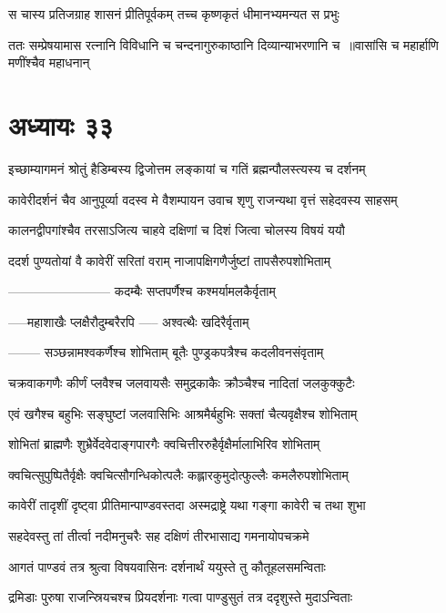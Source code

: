 \twolineshloka
{स चास्य प्रतिजग्राह शासनं प्रीतिपूर्वकम्}
{तच्च कृष्णकृतं धीमानभ्यमन्यत स प्रभुः}


\twolineshloka
{ततः सम्प्रेषयामास रत्नानि विविधानि च}
{चन्दनागुरुकाष्ठानि दिव्यान्याभरणानि च ॥वासांसि च महार्हाणि मणींश्चैव महाधनान्}


\chapter{अध्यायः ३३}
\twolineshloka
{इच्छाम्यागमनं श्रोतुं हैडिम्बस्य द्विजोत्तम}
{लङ्कायां च गतिं ब्रह्मन्पौलस्त्यस्य च दर्शनम्}


\threelineshloka
{कावेरीदर्शनं चैव आनुपूर्व्या वदस्व मे}
{वैशम्पायन उवाच}
{शृणु राजन्यथा वृत्तं सहेदवस्य साहसम्}


\twolineshloka
{कालनद्वीपगांश्चैव तरसाऽजित्य चाहवे}
{दक्षिणां च दिशं जित्वा चोलस्य विषयं ययौ}


\twolineshloka
{ददर्श पुण्यतोयां वै कावेरीं सरितां वराम्}
{नाजापक्षिगणैर्जुष्टां तापसैरुपशोभिताम्}


\twolineshloka
{------------------------}
{कदम्बैः सप्तपर्णैश्च कश्मर्यामलकैर्वृताम्}


\twolineshloka
{-----महाशाखैः प्लक्षैरौदुम्बरैरपि}
{----- अश्वत्थैः खदिरैर्वृताम्}


\twolineshloka
{-------- सञ्छन्नामश्वकर्णैश्च शोभिताम्}
{बूतैः पुण्ड्रकपत्रैश्च कदलीवनसंवृताम्}


\twolineshloka
{चक्रवाकगणैः कीर्णं प्लवैश्च जलवायसैः}
{समुद्रकाकैः क्रौञ्चैश्च नादितां जलकुक्कुटैः}


\twolineshloka
{एवं खगैश्च बहुभिः सङ्घुष्टां जलवासिभिः}
{आश्रमैर्बहुभिः सक्तां चैत्यवृक्षैश्च शोभिताम्}


\twolineshloka
{शोभितां ब्राह्मणैः शुभ्रैर्वेदवेदाङ्गपारगैः}
{क्वचित्तीररुहैर्वृक्षैर्मालाभिरिव शोभिताम्}


\twolineshloka
{क्वचित्सुपुष्पितैर्वृक्षैः क्वचित्सौगन्धिकोत्पलैः}
{कह्लारकुमुदोत्फुल्लैः कमलैरुपशोभिताम्}


\twolineshloka
{कावेरीं तादृशीं दृष्ट्वा प्रीतिमान्पाण्डवस्तदा}
{अस्मद्राष्ट्रे यथा गङ्गा कावेरी च तथा शुभा}


\twolineshloka
{सहदेवस्तु तां तीर्त्वा नदीमनुचरैः सह}
{दक्षिणं तीरभासाद्य गमनायोपचक्रमे}


\twolineshloka
{आगतं पाण्डवं तत्र श्रुत्वा विषयवासिनः}
{दर्शनार्थं ययुस्ते तु कौतूहलसमन्विताः}


\twolineshloka
{द्रमिडाः पुरुषा राजन्स्रियचश्च प्रियदर्शनाः}
{गत्वा पाण्डुसुतं तत्र ददृशुस्ते मुदाऽन्विताः}


